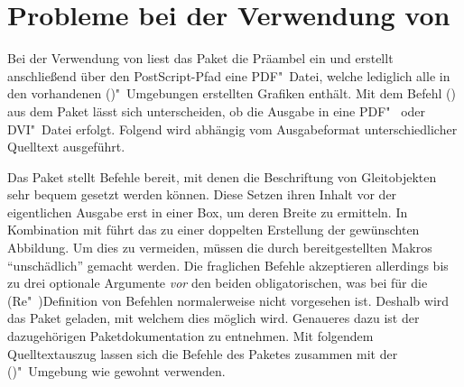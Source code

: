 \section{%
  Probleme bei der Verwendung von %
}
%
Bei der Verwendung von  liest das Paket  
die Präambel ein und erstellt anschließend über den PostScript-Pfad 
 eine PDF"~Datei, welche lediglich alle in den 
vorhandenen ()"~Umgebungen erstellten 
Grafiken enthält. Mit dem Befehl () aus dem Paket 
 lässt sich unterscheiden, ob die Ausgabe in eine PDF"~ oder 
DVI"~Datei erfolgt. Folgend wird abhängig vom Ausgabeformat unterschiedlicher 
Quelltext ausgeführt.
%
\begin{quoting}
\begin{Code}
\usepackage{iftex}
\end{Code}
\end{quoting}

%
Das Paket  stellt Befehle bereit, mit denen die Beschriftung 
von Gleitobjekten sehr bequem gesetzt werden können. Diese Setzen ihren Inhalt 
vor der eigentlichen Ausgabe erst in einer Box, um deren Breite zu ermitteln. 
In Kombination mit  führt das zu einer doppelten 
Erstellung der gewünschten Abbildung. Um dies zu vermeiden, müssen die durch 
 bereitgestellten Makros \enquote{unschädlich} gemacht 
werden. Die fraglichen Befehle akzeptieren allerdings bis zu drei optionale 
Argumente \emph{vor} den beiden obligatorischen, was bei  für die 
(Re"~)Definition von Befehlen normalerweise nicht vorgesehen ist. Deshalb wird 
das Paket  geladen, mit welchem dies möglich wird. Genaueres 
dazu ist der dazugehörigen Paketdokumentation zu entnehmen. Mit folgendem 
Quelltextauszug lassen sich die Befehle des Paketes  zusammen 
mit der ()"~Umgebung wie gewohnt 
verwenden.
%
\begin{quoting}
\begin{Code}
\usepackage{floatrow}
\usepackage{xparse}
\ifpdf\else
\fi
\end{Code}
\end{quoting}

